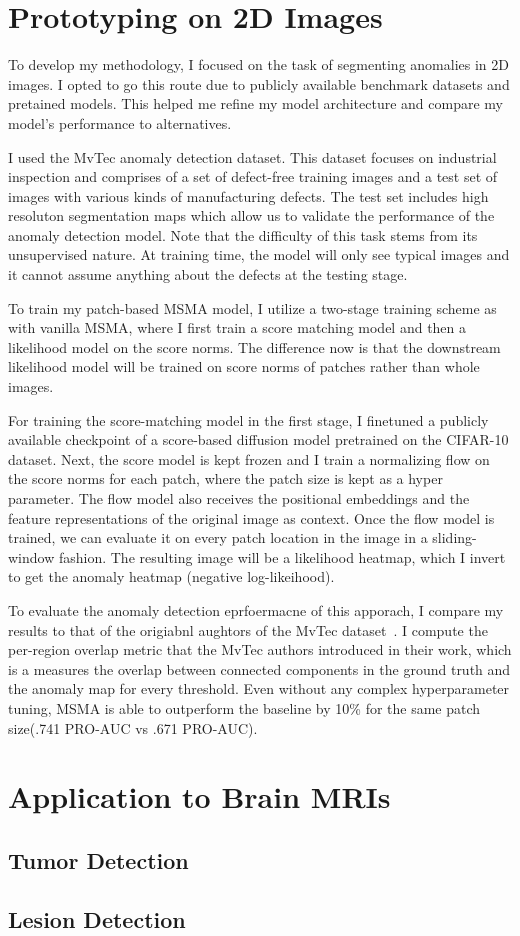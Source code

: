 \section{Prototyping on 2D Images}

To develop my methodology, I focused on the task of segmenting anomalies in 2D images. I opted to go this route due to publicly available benchmark datasets and pretained models. This helped me refine my model architecture and compare my model's performance to alternatives.

I used the MvTec anomaly detection dataset. This dataset focuses on industrial inspection and comprises of a set of defect-free training images and a test set of images with various kinds of manufacturing defects. The test set includes high resoluton segmentation maps which allow us to validate the performance of the anomaly detection model. Note that the difficulty of this task stems from its unsupervised nature. At training time, the model will only see typical images and it cannot assume anything about the defects at the testing stage.

To train my patch-based MSMA model, I utilize a two-stage training scheme as with vanilla MSMA, where I first train a score matching model and then a likelihood model on the score norms. The difference now is that the downstream likelihood model will be trained on score norms of patches rather than whole images.

For training the score-matching model in the first stage, I finetuned a publicly available checkpoint of a score-based diffusion model pretrained on the CIFAR-10 dataset. Next, the score model is kept frozen and I train a normalizing flow on the score norms for each patch, where the patch size is kept as a hyper parameter. The flow model also receives the positional embeddings and the feature representations of the original image as context. Once the flow model is trained, we can evaluate it on every patch location in the image in a sliding-window fashion. The resulting image will be a likelihood heatmap, which I invert to get the anomaly heatmap (negative log-likeihood).

To evaluate the anomaly detection eprfoermacne of this apporach, I compare my results to that of the origiabnl aughtors of the MvTec dataset~\cite{bergmann2020uninformed}. I compute the per-region overlap metric that the MvTec authors introduced in their work, which is a measures the overlap between connected components in the ground truth and the anomaly map for every threshold. Even without any complex hyperparameter tuning, MSMA is able to outperform the baseline by 10\% for the same patch size(.741 PRO-AUC vs .671 PRO-AUC).


\section{Application to Brain MRIs}

\subsection{Tumor Detection}

\subsection{Lesion Detection}
